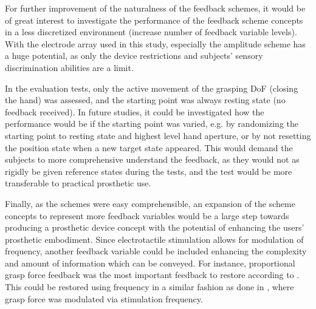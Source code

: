 For further improvement of the naturalness of the feedback schemes, it would be of great interest to investigate the performance of the feedback scheme concepts in a less discretized environment (increase number of feedback variable levels). With the electrode array used in this study, especially the amplitude scheme has a huge potential, as only the device restrictions and subjects' sensory discrimination abilities are a limit.

In the evaluation tests, only the active movement of the grasping DoF (closing the hand) was assessed, and the starting point was always resting state (no feedback received). In future studies, it could be investigated how the performance would be if the starting point was varied, e.g. by randomizing the starting point to resting state and highest level hand aperture, or by not resetting the position state when a new target state appeared. This would demand the subjects to more comprehensive understand the feedback, as they would not as rigidly be given reference states during the tests, and the test would be more transferable to practical prosthetic use.

Finally, as the schemes were easy comprehensible, an expansion of the scheme concepts to represent more feedback variables would be a large step towards producing a prosthetic device concept with the potential of enhancing the users' prosthetic embodiment. Since electrotactile stimulation allows for modulation of frequency, another feedback variable could be included enhancing the complexity and amount of information which can be conveyed. For instance, proportional grasp force feedback was the most important feedback to restore according to \cite{Peerdeman2011}. This could be restored using frequency in a similar fashion as done in \cite{Dosen2016}, where grasp force was modulated via stimulation frequency. 
 



